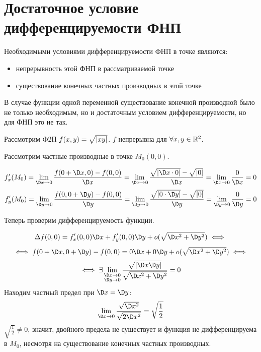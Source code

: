 \documentclass[../../main.tex]{subfiles}
\begin{document}
\section{Достаточное условие дифференцируемости ФНП}

Необходимыми условиями дифференцируемости ФНП в точке являются:
\begin{itemize}
\item непрерывность этой ФНП в рассматриваемой точке
\item существование конечных частных производных в этой точке
\end{itemize}
В случае функции одной переменной существование конечной производной было
не только необходимым, но и достаточным условием дифференцируемости, но
для ФНП это не так.
\begin{exmp}
Рассмотрим Ф2П $f(x,y) = \sqrt{\left|{xy}\right|}$. $f$ непрерывна для $\forall x,y
\in \mathbb{R}^2$.

Рассмотрим частные производные в точке $M_0(0,0)$.

\[
f'_x(M_0) = 
\lim_{\D x \to 0} \frac{f(0+\D x, 0) -f(0,0)}{\D x}=
\lim_{\D x \to 0} \frac{\sqrt{\abs{\D x \cdot 0}}-\sqrt{\abs{0}}}{\D x}=
\lim_{\D x \to 0} \frac{0}{\D x}=
0
\]
\[
f'_y(M_0) = 
\lim_{\D y \to 0} \frac{f(0,0+\D y) -f(0,0)}{\D y}=
\lim_{\D y \to 0} \frac{\sqrt{\abs{0 \cdot \D y}}-\sqrt{\abs{0}}}{\D y}=
\lim_{\D y \to 0} \frac{0}{\D y}=
0
\]

Теперь проверим дифференцируемость функции.

\[\Delta f(0,0) = f'_x(0,0)\D x+f'_y(0,0)\D y + o(\sqrt{\D x^2+\D y^2})
\iff\]
\[\iff f(0+\D x,0+\D y)-f(0,0)=0\D x+0\D y+o(\sqrt{\D x^2+\D y^2})\iff\]
\[\iff \exists\lim_{\substack{\D x \to 0\\ \D y \to 0}}
\frac{\sqrt{\abs{\D x\D y}}}{\sqrt{\D x^2+\D y^2}}=0\]
Находим частный предел при $\D x = \D y$:
\[\lim_{\D x \to 0}\frac{\sqrt{\D x^2}}{\sqrt{2\D x^2}} = \sqrt{\frac{1}
{2}}\]
$\sqrt{\frac{1}{2}}\neq 0$, значит, двойного предела не существует и
функция не дифференцируема в $M_0$, несмотря на существование конечных
частных производных.
\end{exmp}
\end{document}
